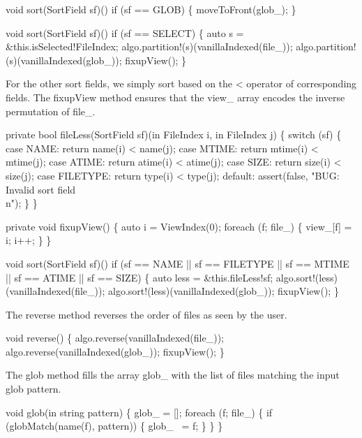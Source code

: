 void sort(SortField sf)()
  if (sf == GLOB)
\{
  moveToFront(glob_);
\}

void sort(SortField sf)()
  if (sf == SELECT)
\{
  auto s = &this.isSelected!FileIndex;
  algo.partition!(s)(vanillaIndexed(file_));
  algo.partition!(s)(vanillaIndexed(glob_));
  fixupView();
\}

\nwendcode{}For the other sort fields, we simply sort based on the {\Tt{}<\nwendquote}
operator of corresponding fields. The {\Tt{}fixupView\nwendquote} method ensures
that the {\Tt{}view{\_}\nwendquote} array encodes the inverse permutation of
{\Tt{}file{\_}\nwendquote}.

\nwenddocs{}\plusendmoddef\nwstartdeflinemarkup\nwenddeflinemarkup
private bool fileLess(SortField sf)(in FileIndex i, in FileIndex j)
\{
  switch (sf) \{
    case NAME:     return name(i)  < name(j);
    case MTIME:    return mtime(i) < mtime(j);
    case ATIME:    return atime(i) < atime(j);
    case SIZE:     return size(i)  < size(j);
    case FILETYPE: return type(i)  < type(j);
    default: assert(false, "BUG: Invalid sort field\\n");
  \}
\}

private void fixupView()
\{
  auto i = ViewIndex(0);
  foreach (f; file_) \{
    view_[f] = i;
    i++;
  \}
\}

void sort(SortField sf)()
  if (sf == NAME     ||
      sf == FILETYPE ||
      sf == MTIME    ||
      sf == ATIME    ||
      sf == SIZE)
\{
  auto less   = &this.fileLess!sf;
  algo.sort!(less)(vanillaIndexed(file_));
  algo.sort!(less)(vanillaIndexed(glob_));
  fixupView();
\}

\nwendcode{}The {\Tt{}reverse\nwendquote} method reverses the order of files as seen by the
user.

\nwenddocs{}\plusendmoddef\nwstartdeflinemarkup\nwenddeflinemarkup
void reverse()
\{
  algo.reverse(vanillaIndexed(file_));
  algo.reverse(vanillaIndexed(glob_));
  fixupView();
\}

\nwendcode{}The {\Tt{}glob\nwendquote} method fills the array {\Tt{}glob{\_}\nwendquote} with the list of files
matching the input glob pattern.

\nwenddocs{}\plusendmoddef\nwstartdeflinemarkup\nwenddeflinemarkup
void glob(in string pattern)
\{
  glob_ = [];
  foreach (f; file_) \{
    if (globMatch(name(f), pattern)) \{
      glob_ ~= f;
    \}
  \}
\}

